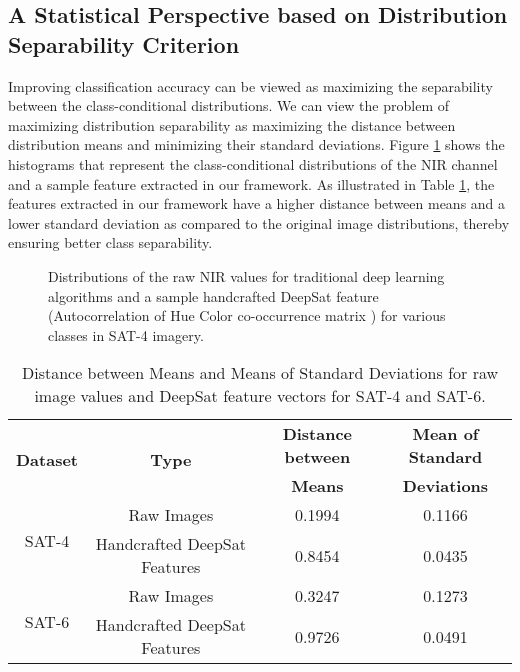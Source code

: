 \documentclass[]{interact}
\theoremstyle{plain}\newtheorem{theorem}{Theorem}[section]
\theoremstyle{definition}
\theoremstyle{remark}
\begin{document}
\subsection{A Statistical Perspective based on Distribution Separability Criterion}\label{statistical_perspective}
Improving classification accuracy can be viewed as maximizing the separability between the class-conditional distributions. We can view the problem of maximizing distribution separability \citep{Boureau10atheoretical} as maximizing the distance between distribution means and minimizing their standard deviations. Figure \ref{fig:distributions} shows the histograms that represent the class-conditional distributions of the NIR channel and a sample feature extracted in our framework. As illustrated in Table \ref{table:Distribution_mean_and_sd}, the features extracted in our framework have a higher distance between means and a lower standard deviation as compared to the original image distributions, thereby ensuring better class separability.

\begin{figure}[t]
\centering
{}
\hspace{10mm}
\caption{Distributions of the raw NIR values for traditional deep learning algorithms and a sample handcrafted DeepSat feature (Autocorrelation of Hue Color co-occurrence matrix \cite{boyda2017deploying}) for various classes in SAT-4 imagery.}
\label{fig:distributions}
\end{figure}


\begin{table}[b]
\begin{center}
\footnotesize
\begin{tabular}{ | c | c | c | c | }
    \hline
 \multirow{2}{*}{\textbf{Dataset}} & \multirow{2}{*}{\textbf{Type}} & \textbf{Distance between} & \textbf{Mean of Standard} \\ 
 &   & \textbf{Means} &   \textbf{Deviations}  \\ \hline
 \multirow{2}{*}{SAT-4} & Raw Images & 0.1994 & 0.1166 \\ 
  & Handcrafted DeepSat Features & 0.8454 & 0.0435 \\ \hline
 \multirow{2}{*}{SAT-6} & Raw Images & 0.3247 & 0.1273 \\
  & Handcrafted DeepSat Features & 0.9726 & 0.0491 \\ \hline
  \end{tabular}
  \end{center}
  \caption{Distance between Means and  Means of Standard Deviations for raw image values and DeepSat feature vectors for SAT-4 and SAT-6.}
  \label{table:Distribution_mean_and_sd}
\end{table}
\end{document}
